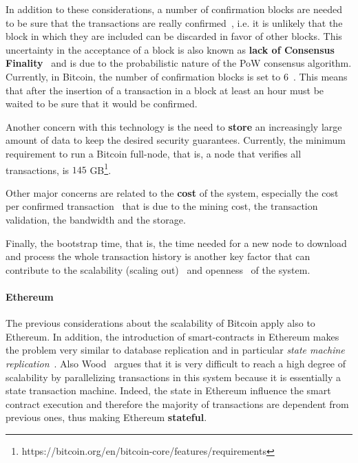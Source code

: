 In addition to these considerations, a number of confirmation blocks are needed
to be sure that the transactions are really confirmed~\cite{bib:taxonomy}, i.e.
it is unlikely that the block in which they are included can be discarded in
favor of other blocks. This uncertainty in the acceptance of a block is also
known as \textbf{lack of Consensus Finality}~\cite{bib:the-quest} and is due to
the probabilistic nature of the PoW consensus algorithm. Currently, in Bitcoin,
the number of confirmation blocks is set to $6$~\cite{bib:masteringbitcoin}.
This means that after the insertion of a transaction in a block at least an hour
must be waited to be sure that it would be confirmed.

Another concern with this technology is the need to \textbf{store} an
increasingly large amount of data to keep the desired security guarantees.
Currently, the minimum requirement to run a Bitcoin full-node, that is, a node
that verifies all transactions, is $145$
GB\footnote{https://bitcoin.org/en/bitcoin-core/features/requirements}.

Other major concerns are related to the \textbf{cost} of the system, especially
the cost per confirmed transaction~\cite{bib:scaling-croman} that is due to the
mining cost, the transaction validation, the bandwidth and the storage.

Finally, the bootstrap time, that is, the time needed
for a new node to download and process the whole transaction history is another
key factor that can contribute to the scalability (scaling
out)~\cite{bib:scaling-croman} and openness~\cite{van2017distributed} of the
system.

\paragraph{Ethereum} The previous considerations about the scalability of
Bitcoin apply also to Ethereum. In addition, the introduction of
smart-contracts in Ethereum makes the problem very similar to database
replication and in particular \emph{state machine
replication}~\cite{bib:the-quest}. Also Wood~\cite{wood2018ethereum} argues
that  it is very difficult to reach a high degree of scalability by
parallelizing transactions in this system because it is essentially a state
transaction machine. Indeed, the state in Ethereum influence the smart contract
execution and therefore the majority of transactions are dependent from
previous ones, thus making Ethereum \textbf{stateful}.




